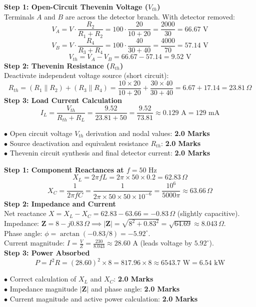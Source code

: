 \begin{solutionbox}
\textbf{Step 1: Open-Circuit Thevenin Voltage ($V_{th}$)}\\
Terminals $A$ and $B$ are across the detector branch. With detector removed:
\[ V_A = V \cdot \frac{R_2}{R_1 + R_2} = 100 \cdot \frac{20}{10 + 20} = \frac{2000}{30} = 66.67\text{ V} \]
\[ V_B = V \cdot \frac{R_4}{R_3 + R_4} = 100 \cdot \frac{40}{30 + 40} = \frac{4000}{70} = 57.14\text{ V} \]
\[ V_{th} = V_A - V_B = 66.67 - 57.14 = 9.52\text{ V} \]
\textbf{Step 2: Thevenin Resistance ($R_{th}$)}\\
Deactivate independent voltage source (short circuit):
\[ R_{th} = (R_1 \parallel R_2) + (R_3 \parallel R_4) = \frac{10 \times 20}{10 + 20} + \frac{30 \times 40}{30 + 40} = 6.67 + 17.14 = 23.81\,\Omega \]
\textbf{Step 3: Load Current Calculation}\\
\[ I_L = \frac{V_{th}}{R_{th} + R_L} = \frac{9.52}{23.81 + 50} = \frac{9.52}{73.81} \approx 0.129\text{ A} = 129\text{ mA} \]
\begin{markingrubric}
$\bullet$ Open circuit voltage $V_{th}$ derivation and nodal values: \textbf{2.0 Marks}\\
$\bullet$ Source deactivation and equivalent resistance $R_{th}$: \textbf{2.0 Marks}\\
$\bullet$ Thevenin circuit synthesis and final detector current: \textbf{2.0 Marks}
\end{markingrubric}
\end{solutionbox}

\begin{solutionbox}
\textbf{Step 1: Component Reactances at $f = 50\text{ Hz}$}\\
\[ X_L = 2\pi f L = 2\pi \times 50 \times 0.2 = 62.83\,\Omega \]
\[ X_C = \frac{1}{2\pi f C} = \frac{1}{2\pi \times 50 \times 50 \times 10^{-6}} = \frac{10^6}{5000\pi} \approx 63.66\,\Omega \]
\textbf{Step 2: Impedance and Current}\\
Net reactance $X = X_L - X_C = 62.83 - 63.66 = -0.83\,\Omega$ (slightly capacitive).\\
Impedance: $\mathbf{Z} = 8 - j0.83\,\Omega \implies |\mathbf{Z}| = \sqrt{8^2 + 0.83^2} = \sqrt{64.69} \approx 8.043\,\Omega$.\\
Phase angle: $\phi = \arctan(-0.83/8) = -5.92^\circ$.\\
Current magnitude: $I = \frac{V}{Z} = \frac{230}{8.043} \approx 28.60\text{ A}$ (leads voltage by $5.92^\circ$).\\
\textbf{Step 3: Power Absorbed}\\
\[ P = I^2 R = (28.60)^2 \times 8 = 817.96 \times 8 \approx 6543.7\text{ W} = 6.54\text{ kW} \]
\begin{markingrubric}
$\bullet$ Correct calculation of $X_L$ and $X_C$: \textbf{2.0 Marks}\\
$\bullet$ Impedance magnitude $|\mathbf{Z}|$ and phase angle: \textbf{2.0 Marks}\\
$\bullet$ Current magnitude and active power calculation: \textbf{2.0 Marks}
\end{markingrubric}
\end{solutionbox}
\newpage
